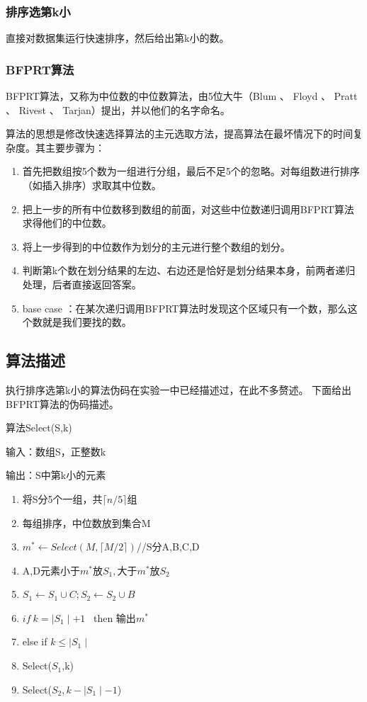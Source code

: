 \documentclass[UTF8]{ctexart}
\begin{document}
\subsubsection{排序选第k小}
直接对数据集运行快速排序，然后给出第k小的数。
\subsubsection{BFPRT算法}
BFPRT算法，又称为中位数的中位数算法，由5位大牛（Blum 、 Floyd 、 Pratt 、 Rivest 、 Tarjan）提出，并以他们的名字命名。
\par
算法的思想是修改快速选择算法的主元选取方法，提高算法在最坏情况下的时间复杂度。其主要步骤为：
\begin{enumerate}
    \item 首先把数组按5个数为一组进行分组，最后不足5个的忽略。对每组数进行排序（如插入排序）求取其中位数。
    \item 把上一步的所有中位数移到数组的前面，对这些中位数递归调用BFPRT算法求得他们的中位数。
    \item 将上一步得到的中位数作为划分的主元进行整个数组的划分。
    \item 判断第k个数在划分结果的左边、右边还是恰好是划分结果本身，前两者递归处理，后者直接返回答案。
    \item base case ：在某次递归调用BFPRT算法时发现这个区域只有一个数，那么这个数就是我们要找的数。
\end{enumerate}
\subsection{算法描述}
执行排序选第k小的算法伪码在实验一中已经描述过，在此不多赘述。
下面给出BFPRT算法的伪码描述。\par
算法Select(S,k)\par
输入：数组S，正整数k\par
输出：S中第k小的元素
\begin{enumerate}
    \item 将S分5个一组，共$\lceil n/5 \rceil$组
    \item 每组排序，中位数放到集合M
    \item $m^* \gets Select(M,\lceil M/2 \rceil)$//S分A,B,C,D
    \item A,D元素小于$m^*放S_1,大于m^*放S_2$
    \item $S_1 \gets S_1 \cup C; S_2 \gets S_2 \cup B$
    \item $if \ k= \mid S_1 \mid +1$ \ then 输出$m^*$
    \item else if $k \le \mid S_1 \mid$
    \item \qquad Select($S_1$,k)
    \item \qquad Select($S_2,k-\mid S_1 \mid -1$)
\end{enumerate}
\end{document}
